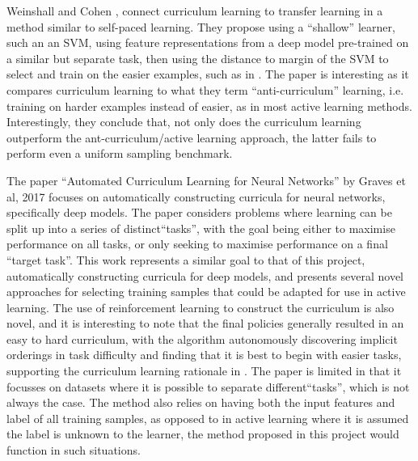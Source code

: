 \documentclass[a4paper,11pt]{article}
\begin{document}
Weinshall and Cohen \cite{Weinshall 2018}, connect curriculum learning to transfer learning in a method similar to self-paced learning. They propose using a ``shallow'' learner, such an an SVM, using feature representations from a deep model pre-trained on a similar but separate task, then using the distance to margin of the SVM to select and train on the easier examples, such as in \cite{Koller 2010}. The paper is interesting as it compares curriculum learning to what they term ``anti-curriculum'' learning, i.e. training on harder examples instead of easier, as in most active learning methods. Interestingly, they conclude that, not only does the curriculum learning outperform the ant-curriculum/active learning approach, the latter fails to perform even a uniform sampling benchmark.

The paper ``Automated Curriculum Learning for Neural Networks'' by Graves et al, 2017 \cite{Graves 2017} focuses on automatically constructing curricula for neural networks, specifically deep models. The paper considers problems where learning can be split up into a series of distinct``tasks'', with the goal being either to maximise performance on all tasks, or only seeking to maximise performance on a final ``target task''. This work represents a similar goal to that of this project, automatically constructing curricula for deep models, and presents several novel approaches for selecting training samples that could be adapted for use in active learning. The use of reinforcement learning to construct the curriculum is also novel, and it is interesting to note that the final policies generally resulted in an easy to hard curriculum, with the algorithm autonomously discovering implicit orderings in task difficulty and finding that it is best to begin with easier tasks, supporting the curriculum learning rationale in \cite{Bengio 09}. The paper is limited in that it focusses on datasets where it is possible to separate different``tasks'', which is not always the case. The method also relies on having both the input features and label of all training samples, as opposed to in active learning where it is assumed the label is unknown to the learner, the method proposed in this project would function in such situations.
\end{document}
